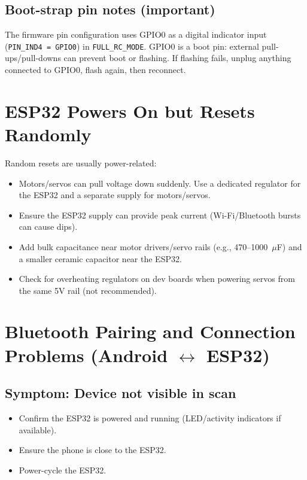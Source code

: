 \subsection*{Boot-strap pin notes (important)}
The firmware pin configuration uses GPIO0 as a digital indicator input (\texttt{PIN\_IND4 = GPIO0}) in
\texttt{FULL\_RC\_MODE}. GPIO0 is a boot pin: external pull-ups/pull-downs can prevent boot or flashing.
If flashing fails, unplug anything connected to GPIO0, flash again, then reconnect.

\section{ESP32 Powers On but Resets Randomly}
\label{sec:esp32-resets}

Random resets are usually power-related:

\begin{itemize}
    \item Motors/servos can pull voltage down suddenly. Use a dedicated regulator for the ESP32 and a separate supply for motors/servos.
    \item Ensure the ESP32 supply can provide peak current (Wi-Fi/Bluetooth bursts can cause dips).
    \item Add bulk capacitance near motor drivers/servo rails (e.g., 470--1000~\(\mu\)F) and a smaller ceramic capacitor near the ESP32.
    \item Check for overheating regulators on dev boards when powering servos from the same 5V rail (not recommended).
\end{itemize}

\section{Bluetooth Pairing and Connection Problems (Android \texorpdfstring{$\leftrightarrow$}{<->} ESP32)}
\label{sec:bluetooth-problems}

\subsection*{Symptom: Device not visible in scan}
\begin{itemize}
    \item Confirm the ESP32 is powered and running (LED/activity indicators if available).
    \item Ensure the phone is close to the ESP32.
    \item Power-cycle the ESP32.
\end{itemize}

